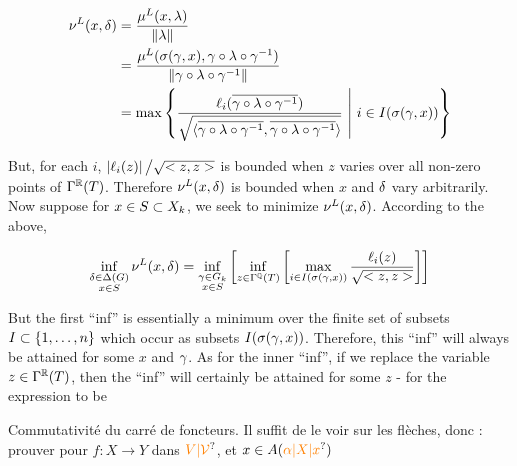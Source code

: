 \[
\begin{aligned}
\handwritten{\nu}^L(x,\handwritten{\delta})&=\frac{\handwritten{\mu}^{L}(x,\lambda)}{\Vert\lambda\Vert}\\
&=\frac{\handwritten{\mu}^{L}(\sigma(\handwritten{\gamma},x),\handwritten{\gamma}\circ\lambda\circ\handwritten{\gamma}^{-1})}{\Vert\handwritten{\gamma}\circ\lambda\circ\handwritten{\gamma}^{-1}\Vert}\\
&=\max\handwritten{\left\{}\frac{\handwritten{\ell}_i(\handwritten{\overline}{\handwritten{\gamma}\circ\lambda\circ\handwritten{\gamma}^{-1}})}{\sqrt{\langle\handwritten{\overline}{\handwritten{\gamma}\circ\lambda\circ\handwritten{\gamma}^{-1}},\handwritten{\overline}{\handwritten{\gamma}\circ\lambda\circ\handwritten{\gamma}^{-1}}\rangle}}\ \handwritten{\middle|}\ i\in I(\sigma(\handwritten{\gamma},x))\handwritten{\right\}}
\end{aligned}
\]

But, for each $i$, $\left|\ell_i(z)\right|\big/\sqrt{<z,z>}$ is bounded when $z$ varies over all non-zero points of $\Gamma^{\mathbb R}(T)$. Therefore $\nu^L(x,\delta)$ is bounded when $x$ and $\delta$ vary arbitrarily. Now suppose for $x\in S\subset X_k$, we seek to minimize $\nu^L(x,\delta)$. According to the above,

\[
\inf_{\substack{\delta\in\Delta(G)\\x\in S}}\nu^{L}(x,\delta)
=\inf_{\substack{\gamma\in G_k\\x\in S}}
\left[\inf_{z\in\Gamma^{\mathbb Q}(T)}
\left[\max_{i\in I(\sigma(\gamma,x))}
\frac{\ell_i(z)}{\sqrt{<z,z>}}\right]\right]
\]

But the first ``inf'' is essentially a minimum over the finite set of subsets $I\subset\{1,\ldots,n\}$ which occur as subsets $I(\sigma(\gamma,x))$. Therefore, this ``inf'' will always be attained for some $x$ and $\gamma$. As for the inner ``inf'', if we replace the variable  $z\in\Gamma^{\mathbb R}(T)$, then the ``inf'' will certainly be attained for some $z$ - for the expression to be

Commutativité du carré de foncteurs. Il suffit de le voir sur les flèches, donc : prouver pour $f:X\to Y$ dans $\unsure{V|\mathcal V}$, et $x\in A(\unsure{\alpha|X|x})$

